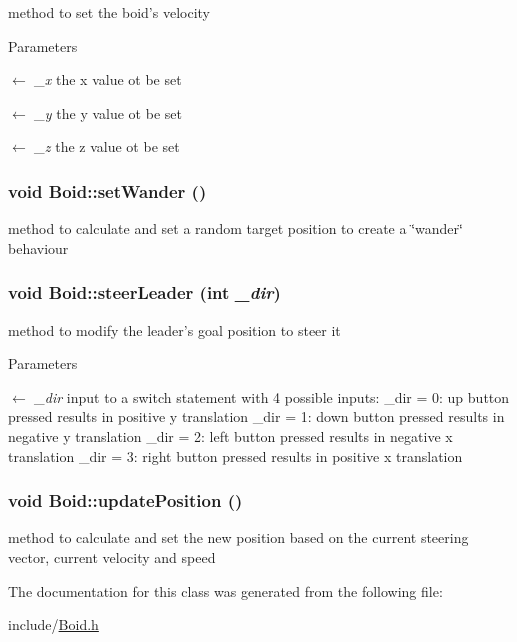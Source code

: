 method to set the boid's velocity 
\begin{DoxyParams}{Parameters}
\item[\mbox{$\leftarrow$} {\em \_\-x}]the x value ot be set \item[\mbox{$\leftarrow$} {\em \_\-y}]the y value ot be set \item[\mbox{$\leftarrow$} {\em \_\-z}]the z value ot be set \end{DoxyParams}
\hypertarget{classBoid_a2ee1a9cb854d72bcd37941da6e542df3}{
\subsubsection[{setWander}]{\setlength{\rightskip}{0pt plus 5cm}void Boid::setWander ()}}
\label{classBoid_a2ee1a9cb854d72bcd37941da6e542df3}


method to calculate and set a random target position to create a \char`\"{}wander\char`\"{} behaviour \hypertarget{classBoid_ade58ac3405f2cd75d2e3b76a53fd0737}{
\subsubsection[{steerLeader}]{\setlength{\rightskip}{0pt plus 5cm}void Boid::steerLeader (int {\em \_\-dir})}}
\label{classBoid_ade58ac3405f2cd75d2e3b76a53fd0737}


method to modify the leader's goal position to steer it 
\begin{DoxyParams}{Parameters}
\item[\mbox{$\leftarrow$} {\em \_\-dir}]input to a switch statement with 4 possible inputs: \_\-dir = 0: up button pressed results in positive y translation \_\-dir = 1: down button pressed results in negative y translation \_\-dir = 2: left button pressed results in negative x translation \_\-dir = 3: right button pressed results in positive x translation \end{DoxyParams}
\hypertarget{classBoid_a9133cb1a761dbbd80a535b4f5576dd00}{
\subsubsection[{updatePosition}]{\setlength{\rightskip}{0pt plus 5cm}void Boid::updatePosition ()}}
\label{classBoid_a9133cb1a761dbbd80a535b4f5576dd00}


method to calculate and set the new position based on the current steering vector, current velocity and speed 

The documentation for this class was generated from the following file:\begin{DoxyCompactItemize}
\item 
include/\hyperlink{Boid_8h}{Boid.h}\end{DoxyCompactItemize}
